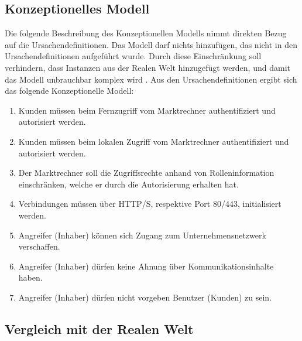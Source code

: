 \documentclass[11pt,a4paper]{report}
\begin{document}
\subsection{Konzeptionelles Modell}

Die folgende Beschreibung des Konzeptionellen Modells nimmt direkten Bezug auf die Ursachendefinitionen. Das Modell darf nichts hinzufügen, das nicht in den Ursachendefinitionen aufgeführt wurde. Durch diese Einschränkung soll verhindern, dass Instanzen aus der Realen Welt hinzugefügt werden, und damit das Modell unbrauchbar komplex wird \cite{gutmann6}. Aus den Ursachendefinitionen ergibt sich das folgende Konzeptionelle Modell:

\begin{enumerate}[leftmargin=*]
\item Kunden müssen beim Fernzugriff vom Marktrechner authentifiziert und autorisiert werden.
\item Kunden müssen beim lokalen Zugriff vom Marktrechner authentifiziert und autorisiert werden.
\item Der Marktrechner soll die Zugriffsrechte anhand von Rolleninformation einschränken, welche er durch die Autorisierung erhalten hat.
\item Verbindungen müssen über HTTP/S, respektive Port 80/443, initialisiert werden.
\item Angreifer (Inhaber) können sich Zugang zum Unternehmensnetzwerk verschaffen.
\item Angreifer (Inhaber) dürfen keine Ahnung über Kommunikationsinhalte haben.
\item Angreifer (Inhaber) dürfen nicht vorgeben Benutzer (Kunden) zu sein.
\end{enumerate}

\subsection{Vergleich mit der Realen Welt}
\end{document}
